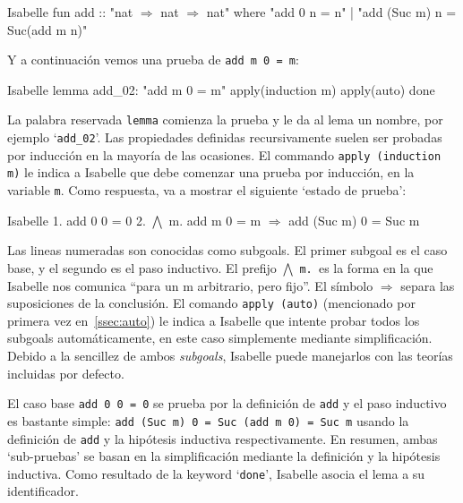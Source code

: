 \documentclass[12pt]{book}
\begin{document}
\begin{code}[title=Definición de la suma para dos números naturales.]{Isabelle}
  fun add :: "nat $\Rightarrow$ nat $\Rightarrow$ nat" where
  "add 0 n = n" |
  "add (Suc m) n = Suc(add m n)"
\end{code}

Y a continuación vemos una prueba de \texttt{add m 0 = m}:

\begin{code}[title=Prueba de la neutralidad del cero frente a la suma.]{Isabelle}
  lemma add_02: "add m 0 = m"
  apply(induction m)
  apply(auto)	  
  done
\end{code}

La palabra reservada \texttt{lemma} comienza la prueba y le da al lema un nombre, por ejemplo `\texttt{add\_02}'. Las propiedades definidas recursivamente suelen ser probadas por inducción en la mayoría de las ocasiones. El commando \texttt{apply (induction m)} le indica a Isabelle que debe comenzar una prueba por inducción, en la variable \texttt{m}. Como respuesta, va a mostrar el siguiente `estado de prueba':

\begin{code}[title=Subgoals para la prueba de neutralidad del cero luego de aplicar inducción estructural.] {Isabelle}
	1. add 0 0 = 0
	2. $\bigwedge$ m. add m 0 = m $\Longrightarrow$ add (Suc m) 0 = Suc m	
\end{code}

Las lineas numeradas son conocidas como subgoals. El primer subgoal es el caso base, y el segundo es el paso inductivo. El prefijo $\bigwedge$ \texttt{m. }es la forma en la que Isabelle nos comunica ``para un m arbitrario, pero fijo''. El símbolo $\Longrightarrow$ separa las suposiciones de la conclusión. El comando \texttt{apply (auto)} (mencionado por primera vez en~\ref{ssec:auto}) le indica a Isabelle que intente probar todos los subgoals automáticamente, en este caso simplemente mediante simplificación. Debido a la sencillez de ambos \textit{subgoals}, Isabelle puede manejarlos con las teorías incluidas por defecto. 

El caso base \texttt{add 0 0 = 0} se prueba por la definición de \texttt{add} y el paso inductivo es bastante simple: \texttt{add (Suc m) 0 = Suc (add m 0) = Suc m} usando la definición de \texttt{add} y la hipótesis inductiva respectivamente. En resumen, ambas `sub-pruebas' se basan en la simplificación mediante la definición y la hipótesis inductiva. Como resultado de la keyword `\texttt{done}', Isabelle asocia el lema a su identificador.
\end{document}
